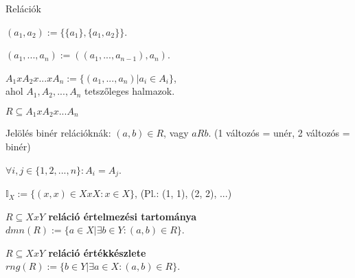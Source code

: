 \begin{frame}[plain]
\begin{tcolorbox}[center, colback={myyellow}, coltext={black}, colframe={myyellow}]
    {\Huge Relációk}
    \mmedskip
\end{tcolorbox}
\end{frame}

\begin{frame}
  \begin{tcolorbox}[title={Def.: Rendezett pár}]
    $(a_1, a_2) := \{ \{ a_1 \}, \{ a_1, a_2 \} \}$.
  \end{tcolorbox}

  \begin{tcolorbox}[title={Def.: Rendezett $n$-es}]
    $(a_1, ..., a_n) := ((a_1, ..., a_{n - 1}), a_n)$.
  \end{tcolorbox}

  \begin{tcolorbox}[title={Def.: Descartes (Direkt) szorzat}]
    $A_1 x A_2 x ... x A_n := \{ (a_1, ..., a_n) | a_i \in A_i \}$,\\
    ahol $A_1, A_2, ..., A_n$ tetszőleges halmazok.
  \end{tcolorbox}

  \begin{tcolorbox}[title={Def.: $n$ változós reláció}]
    $R \subseteq A_1 x A_2 x ... A_n$\\
    \mmedskip

    Jelölés binér relációknák: $(a, b) \in R$, vagy $a R b$.
    (1 változós = unér, 2 változós = binér)
  \end{tcolorbox}

  \begin{tcolorbox}[title={Def.: Homogén reláció}]
    ${\forall}i, j \in \{ 1, 2, ..., n \} : A_i = A_j$.
  \end{tcolorbox}

  \begin{tcolorbox}[title={Def.: Identikus leképzés}]
    $\mathbb{I}_X := \{(x, x) \in X x X : x \in X \}$, (Pl.: (1, 1), (2, 2), ...)
  \end{tcolorbox}

  \begin{tcolorbox}[title={Def.: Reláció értelmezési tartománya}]
    \textbf{$R \subseteq X x Y$ reláció értelmezési tartománya}\\
    $dmn(R) := \{ a \in X | {\exists}b \in Y : (a, b) \in R \}$.
  \end{tcolorbox}

  \begin{tcolorbox}[title={Def.: Reláció értékkészlete}]
    \textbf{$R \subseteq X x Y$ reláció értékkészlete}\\
    $rng(R) := \{ b \in Y | {\exists} a \in X : (a, b) \in R \}$.
  \end{tcolorbox}
\end{frame}

